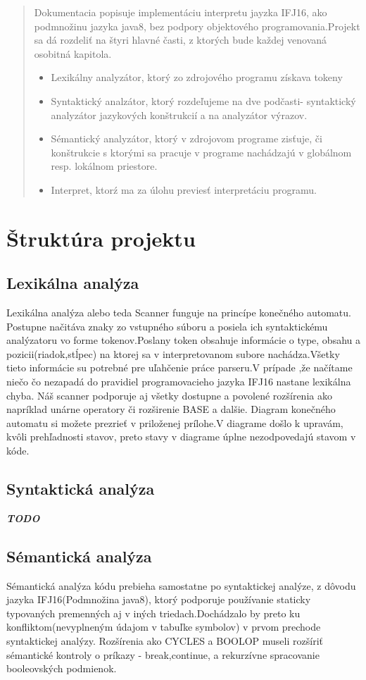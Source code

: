 \documentclass[12pt,a4paper]{report}
\begin{document}
\begin{abstract}
Dokumentacia popisuje implementáciu interpretu jayzka IFJ16, ako podmnožinu jazyka java8, bez podpory objektového programovania.Projekt sa dá rozdeliť na štyri hlavné časti, z ktorých bude každej venovaná osobitná kapitola.
\begin{itemize}
\item Lexikálny analyzátor, ktorý zo zdrojového programu získava tokeny
\item Syntaktický analzátor, ktorý rozdeľujeme na dve podčasti- syntaktický analyzátor jazykových konštrukcií a na analyzátor výrazov.
\item Sémantický analyzátor, ktorý v zdrojovom programe zisťuje, či konštrukcie s ktorými sa pracuje v programe nachádzajú v globálnom resp. lokálnom priestore.
\item Interpret, ktorź ma za úlohu previesť interpretáciu programu.
\end{itemize}
\end{abstract}

\tableofcontents

\chapter{Štruktúra projektu}

\section{Lexikálna analýza}
Lexikálna analýza alebo teda Scanner funguje na princípe konečného automatu. Postupne načitáva  znaky zo vstupného súboru a posiela ich syntaktickému analýzatoru vo forme tokenov.Poslany token obsahuje informácie o type, obsahu a pozicii(riadok,stĺpec) na ktorej sa v interpretovanom subore nachádza.Všetky tieto informácie su potrebné pre uľahčenie práce parseru.V prípade ,že načítame niečo čo nezapadá do pravidiel programovacieho jazyka IFJ16 nastane lexikálna chyba. Náš scanner podporuje aj všetky dostupne a povolené rozšírenia ako napríklad unárne operatory či rozširenie BASE a dalšie. Diagram konečného automatu si možete prezrieť v priloženej prílohe.V diagrame došlo k  upravám, kvôli prehľadnosti stavov, preto stavy v diagrame úplne nezodpovedajú stavom v kóde.
\section{Syntaktická analýza}
\textbf{\textit{TODO}}
\section{Sémantická analýza}
Sémantická analýza kódu prebieha samostatne po syntaktickej analýze, z dôvodu jazyka IFJ16(Podmnožina java8), ktorý podporuje používanie staticky typovaných premenných aj v iných triedach.Dochádzalo by preto ku konfliktom(nevyplneným údajom v tabuľke symbolov) v prvom prechode syntaktickej analýzy. Rozšírenia ako CYCLES a BOOLOP museli rozšíriť sémantické kontroly o príkazy - break,continue, a rekurzívne spracovanie booleovských podmienok.
\end{document}
